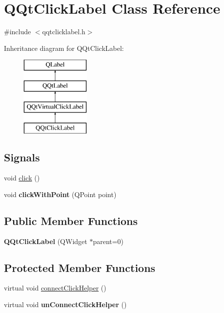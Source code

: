 \hypertarget{class_q_qt_click_label}{}\section{Q\+Qt\+Click\+Label Class Reference}
\label{class_q_qt_click_label}


{\ttfamily \#include $<$qqtclicklabel.\+h$>$}

Inheritance diagram for Q\+Qt\+Click\+Label\+:\begin{figure}[H]
\begin{center}
\leavevmode
\includegraphics[height=4.000000cm]{class_q_qt_click_label}
\end{center}
\end{figure}
\subsection*{Signals}
\begin{DoxyCompactItemize}
\item 
void \mbox{\hyperlink{class_q_qt_click_label_ac17f346ad5ce4ec153eee2b66ed84663}{click}} ()
\item 
\mbox{\label{class_q_qt_click_label_a79897512e3dfdfdbcb6491ba84889a4c}} 
void {\bfseries click\+With\+Point} (Q\+Point point)
\end{DoxyCompactItemize}
\subsection*{Public Member Functions}
\begin{DoxyCompactItemize}
\item 
\mbox{\label{class_q_qt_click_label_afb0679e191c5435019dfca5c1c02c429}} 
{\bfseries Q\+Qt\+Click\+Label} (Q\+Widget $\ast$parent=0)
\end{DoxyCompactItemize}
\subsection*{Protected Member Functions}
\begin{DoxyCompactItemize}
\item 
virtual void \mbox{\hyperlink{class_q_qt_click_label_af20a13941a73c08287b01642a9e126a9}{connect\+Click\+Helper}} ()
\item 
\mbox{\label{class_q_qt_click_label_a358b4e27e3adf995d6aed70faa1afd93}} 
virtual void {\bfseries un\+Connect\+Click\+Helper} ()
\end{DoxyCompactItemize}
